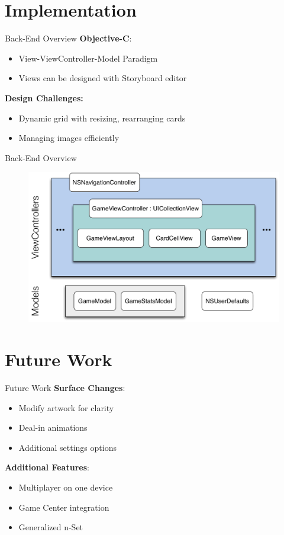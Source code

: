 \documentclass{beamer}
\begin{document}
\section{Implementation}

\begin{frame}[t]{Back-End Overview}
\textbf{Objective-C}:
\begin{itemize}
 \item View-ViewController-Model Paradigm
 \item Views can be designed with Storyboard editor
\end{itemize}
\pause
\vspace{.5cm}
\textbf{Design Challenges:}
\begin{itemize}
 \item Dynamic grid with resizing, rearranging cards
 \item Managing images efficiently
\end{itemize}

\end{frame}

\begin{frame}[t]{Back-End Overview}

\begin{figure}
\centering
\includegraphics[width=.8\paperwidth]{img/design.pdf} 
\end{figure}
\end{frame}

\section{Future Work}
\begin{frame}[t]{Future Work}
 \textbf{Surface Changes}:
\begin{itemize}
 \item Modify artwork for clarity
 \item Deal-in animations
 \item Additional settings options
\end{itemize}

\pause
\vspace{.5cm}

 \textbf{Additional Features}:
\begin{itemize}
 \item Multiplayer on one device
 \item Game Center integration
 \item Generalized n-Set
\end{itemize}
\end{frame}
\end{document}
